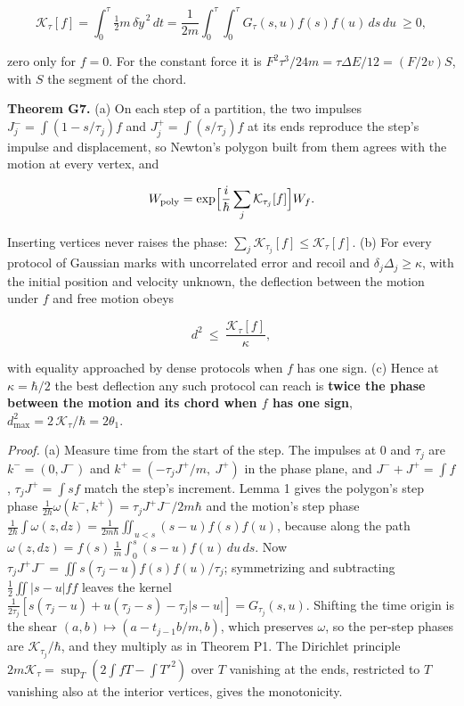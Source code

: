 \documentclass[11pt,a4paper]{article}
\begin{document}
\[\mathcal K_\tau[f]=\int_0^\tau\tfrac12m\,\delta\dot y^{\,2}\,dt
=\frac1{2m}\int_0^\tau\!\!\int_0^\tau G_\tau(s,u)f(s)f(u)\,ds\,du\ \ge0,\]

zero only for \(f=0\). For the constant force it is
\(F^2\tau^3/24m=\tau\Delta E/12=(F/2v)S\), with \(S\) the segment of the
chord.

\textbf{Theorem G7.} (a) On each step of a partition, the two impulses
\(J_j^-=\int(1-s/\tau_j)f\) and \(J_j^+=\int(s/\tau_j)f\) at its ends
reproduce the step's impulse and displacement, so Newton's polygon built
from them agrees with the motion at every vertex, and

\[W_{\rm poly}=\exp\Bigl[\frac{i}{\hbar}\sum_j\mathcal K_{\tau_j}[f]\Bigr]W_f .\]

Inserting vertices never raises the phase:
\(\sum_j\mathcal K_{\tau_j}[f]\le\mathcal K_\tau[f]\). (b) For every
protocol of Gaussian marks with uncorrelated error and recoil and
\(\delta_j\Delta_j\ge\kappa\), with the initial position and velocity
unknown, the deflection between the motion under \(f\) and free motion
obeys

\[d^2\ \le\ \frac{\mathcal K_\tau[f]}{\kappa},\]

with equality approached by dense protocols when \(f\) has one sign. (c)
Hence at \(\kappa=\hbar/2\) the best deflection any such protocol can
reach is \textbf{twice the phase between the motion and its chord when
\(f\) has one sign}, \(d^2_{\max}=2\,\mathcal K_\tau/\hbar=2\theta_1\).

\emph{Proof.} (a) Measure time from the start of the step. The impulses
at \(0\) and \(\tau_j\) are \(k^-=(0,J^-)\) and
\(k^+=(-\tau_jJ^+/m,\ J^+)\) in the phase plane, and \(J^-+J^+=\int f\),
\(\tau_jJ^+=\int sf\) match the step's increment. Lemma 1 gives the
polygon's step phase
\(\frac1{2\hbar}\omega(k^-,k^+)=\tau_jJ^+J^-/2m\hbar\) and the motion's
step phase
\(\frac1{2\hbar}\int\omega(z,dz)=\frac1{2m\hbar}\iint_{u<s}(s-u)f(s)f(u)\),
because along the path
\(\omega(z,dz)=f(s)\,\frac1m\int_0^s(s-u)f(u)\,du\,ds\). Now
\(\tau_jJ^+J^-=\iint s(\tau_j-u)f(s)f(u)/\tau_j\); symmetrizing and
subtracting \(\frac12\iint|s-u|ff\) leaves the kernel
\(\frac1{2\tau_j}[s(\tau_j-u)+u(\tau_j-s)-\tau_j|s-u|]=G_{\tau_j}(s,u)\).
Shifting the time origin is the shear \((a,b)\mapsto(a-t_{j-1}b/m,b)\),
which preserves \(\omega\), so the per-step phases are
\(\mathcal K_{\tau_j}/\hbar\), and they multiply as in Theorem P1. The
Dirichlet principle \(2m\mathcal K_\tau=\sup_T(2\int fT-\int T'^2)\)
over \(T\) vanishing at the ends, restricted to \(T\) vanishing also at
the interior vertices, gives the monotonicity.
\end{document}
